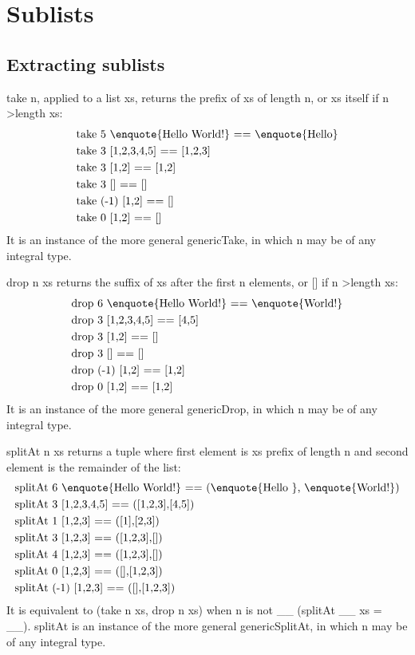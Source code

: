 \section{Sublists}
\subsection{Extracting sublists}

take n, applied to a list xs, returns the prefix of xs of length n, or xs itself if n \textgreater length xs:
\begin{align*}
	&\text{take 5 \enquote{Hello World!} == \enquote{Hello}}\\
	&\text{take 3 [1,2,3,4,5] == [1,2,3]}\\
	&\text{take 3 [1,2] == [1,2]}\\
	&\text{take 3 [] == []}\\
	&\text{take (-1) [1,2] == []}\\
	&\text{take 0 [1,2] == []}
\end{align*}
It is an instance of the more general genericTake, in which n may be of any integral type.

drop n xs returns the suffix of xs after the first n elements, or [] if n \textgreater length xs:
\begin{align*}
	&\text{drop 6 \enquote{Hello World!} == \enquote{World!}}\\
	&\text{drop 3 [1,2,3,4,5] == [4,5]}\\
	&\text{drop 3 [1,2] == []}\\
	&\text{drop 3 [] == []}\\
	&\text{drop (-1) [1,2] == [1,2]}\\
	&\text{drop 0 [1,2] == [1,2]}\\
\end{align*}
It is an instance of the more general genericDrop, in which n may be of any integral type.

splitAt n xs returns a tuple where first element is xs prefix of length n and second element is the remainder of the list:
\begin{align*}
	&\text{splitAt 6 \enquote{Hello World!} == (\enquote{Hello }, \enquote{World!})}\\
	&\text{splitAt 3 [1,2,3,4,5] == ([1,2,3],[4,5])}\\
	&\text{splitAt 1 [1,2,3] == ([1],[2,3])}\\
	&\text{splitAt 3 [1,2,3] == ([1,2,3],[])}\\
	&\text{splitAt 4 [1,2,3] == ([1,2,3],[])}\\
	&\text{splitAt 0 [1,2,3] == ([],[1,2,3])}\\
	&\text{splitAt (-1) [1,2,3] == ([],[1,2,3])}
\end{align*}
It is equivalent to (take n xs, drop n xs) when n is not \_\textbar \_ (splitAt \_\textbar\_ xs = \_\textbar\_). splitAt is an instance of the more general genericSplitAt, in which n may be of any integral type.

